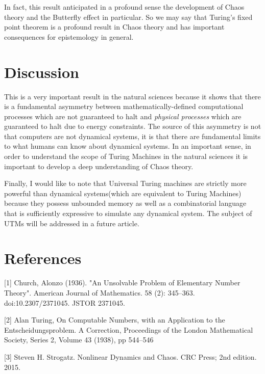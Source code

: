 \documentclass{article}
\begin{document}
In fact, this result anticipated in a profound sense the development of Chaos theory and the Butterfly effect in particular.
So we may say that Turing's fixed point theorem is a profound result in Chaos theory and has important consequences for epistemology in general.

\newpage

\section{Discussion}

This is a very important result in the natural sciences because it shows that there is a fundamental asymmetry between mathematically-defined computational processes which are not guaranteed to halt and \textit{physical processes} which are guaranteed to halt due to energy constraints. The source of this
asymmetry is not that computers are not dynamical systems, it is that there are fundamental limits to what humans can know about dynamical systems. In an important sense, in order to understand the scope of Turing Machines in the natural sciences it is important to develop a deep understanding of Chaos theory.

Finally, I would like to note that Universal Turing machines are strictly more powerful than dynamical systems(which are equivalent to Turing Machines) because they possess unbounded memory as well as a combinatorial language that is sufficiently expressive to simulate any dynamical system. The subject of UTMs will be addressed in a future article.

\section*{References}

\small

[1] Church, Alonzo (1936). "An Unsolvable Problem of Elementary Number Theory". American Journal of Mathematics. 58 (2): 345–363. doi:10.2307/2371045. JSTOR 2371045.

[2] Alan Turing, On Computable Numbers, with an Application to the Entscheidungsproblem. A Correction, Proceedings of the London Mathematical Society, Series 2, Volume 43 (1938), pp 544–546 

[3] Steven H. Strogatz. Nonlinear Dynamics and Chaos. CRC Press; 2nd edition. 2015.
\end{document}
